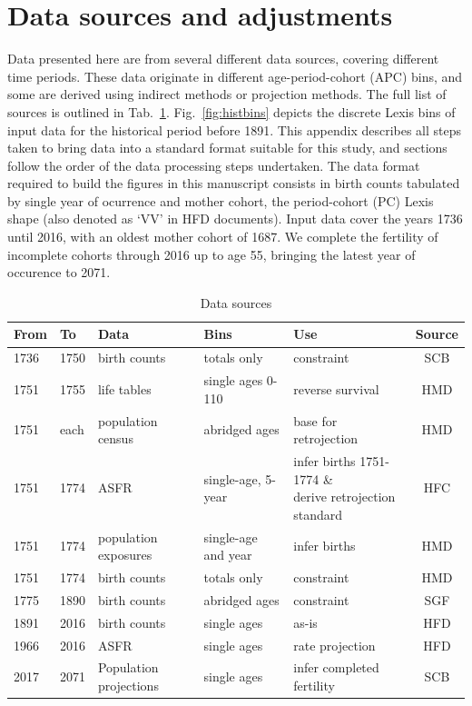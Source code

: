 
\section{Data sources and adjustments}
\label{sec:dataprep}
Data presented here are from several different data sources, covering different time periods. These data originate in different age-period-cohort (APC) bins, and some are derived using indirect methods or projection methods. The full list of sources is outlined in Tab.~\ref{app:sources}. Fig.~\ref{fig:histbins} depicts the discrete Lexis bins of input data for the historical period before 1891. This appendix describes all steps taken to bring data into a standard format suitable for this study, and sections follow the order of the data processing steps undertaken. The data format required to build the figures in this manuscript consists in birth counts tabulated by single year of ocurrence and mother cohort, the period-cohort (PC) Lexis shape (also denoted as `VV' in HFD documents). Input data cover the years 1736 until 2016, with an oldest mother cohort of 1687. We complete the fertility of incomplete cohorts through 2016 up to age 55, bringing the latest year of occurence to 2071.

\begin{table}[ht]
\begin{tabular}{lllllc}
From & To & Data & Bins & Use & Source \\ \hline
1736 & 1750 & birth counts & totals only & constraint & SCB \\
1751 & 1755 & life tables & single ages 0-110 & reverse survival & HMD \\
1751 & each & population census & abridged ages & base for retrojection & HMD \\
1751 & 1774 & ASFR & single-age, 5-year & \makecell{infer births 1751-1774 \&\\ derive retrojection standard} & HFC \\
1751 & 1774 & population exposures & single-age and year & infer births & HMD \\
1751 & 1774 & birth counts & totals only & constraint & HMD \\
1775 & 1890 & birth counts & abridged ages & constraint & SGF \\
1891 & 2016 & birth counts & single ages & as-is & HFD \\
1966 & 2016 & ASFR & single ages & rate projection & HFD \\
2017 & 2071 & Population projections & single ages & infer completed fertility & SCB
\end{tabular}
\caption{Data sources}
\label{app:sources}
\end{table}


